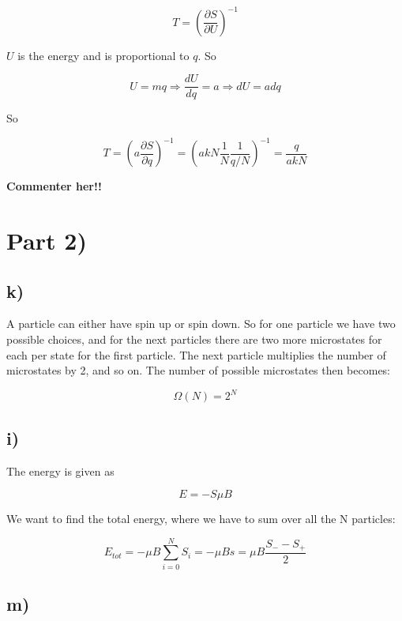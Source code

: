 \documentclass[a4paper,norsk, 10pt]{article}
\begin{document}
\begin{equation}
T = \left(\frac{\partial S}{\partial U}\right)^{-1} 
\end{equation}

$U$ is the energy and is proportional to $q$. So

\begin{equation}
U = mq \Rightarrow \frac{dU}{dq} = a \Rightarrow dU = adq
\end{equation}

So

\begin{equation}
T = \left(a\frac{\partial S}{\partial q}\right)^{-1} = \left(akN\frac{1}{N}\frac{1}{q/N}\right)^{-1} = \frac{q}{akN}
\end{equation}

\textbf{Commenter her!!}

\section{Part 2)}
\subsection{k)}

A particle can either have spin up or spin down. So for one particle we have two possible choices, and for the next particles there are two more microstates for each per state for the first particle. The next particle multiplies the number of microstates by 2, and so on. The number of possible microstates then becomes:

\begin{equation}
\Omega(N) = 2^N
\end{equation}

\subsection{i)}
The energy is given as

\begin{equation}
E = -S\mu B
\end{equation}

We want to find the total energy, where we have to sum over all the N particles:

\begin{equation}
E_{tot} = -\mu B\sum_{i = 0}^{N}S_i = -\mu B s = \mu B\frac{S_- - S_+}{2}
\end{equation}

\subsection{m)}
\end{document}
